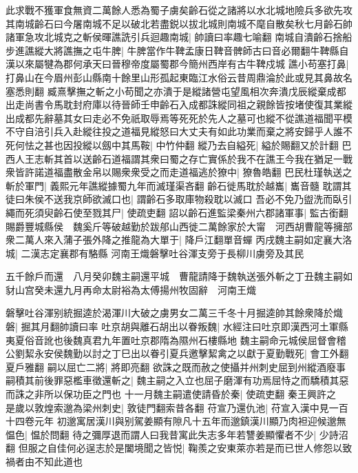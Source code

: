 此求戰不獲軍食無資二萬餘人悉為蜀子虜矣齡石從之諸將以水北城地險兵多欲先攻其南城齡石曰今屠南城不足以破北若盡鋭以拔北城則南城不麾自散矣秋七月齡石帥諸軍急攻北城克之斬侯暉譙詵引兵迴趣南城|{
	帥讀曰率趣七喻翻}
南城自潰齡石捨船步進譙縱大將譙撫之屯牛脾|{
	牛脾當作牛鞞孟康日鞞音髀師古曰音必爾翻牛鞞縣自漢以來屬犍為郡何承天曰晉穆帝度屬蜀郡今簡州西岸有古牛鞞戍城}
譙小苟塞打鼻|{
	打鼻山在今眉州彭山縣南十餘里山形孤起東臨江水俗云昔周鼎淪於此或見其鼻故名塞悉則翻}
臧熹擊撫之斬之小苟聞之亦潰于是縱諸營屯望風相次奔潰戊辰縱棄成都出走尚書令馬耽封府庫以待晉師壬申齡石入成都誅縱同祖之親餘皆按堵使復其業縱出成都先辭墓其女曰走必不免祇取辱焉等死死於先人之墓可也縱不從譙道福聞平模不守自涪引兵入赴縱往投之道福見縱怒曰大丈夫有如此功業而棄之將安歸乎人誰不死何怯之甚也因投縱以劔中其馬鞍|{
	中竹仲翻}
縱乃去自縊死|{
	縊於賜翻又於計翻}
巴西人王志斬其首以送齡石道福謂其衆曰蜀之存亡實係於我不在譙王今我在猶足一戰衆皆許諾道福盡散金帛以賜衆衆受之而走道福逃於獠中|{
	獠魯皓翻}
巴民杜瑾執送之斬於軍門|{
	義熙元年譙縱據蜀九年而滅瑾渠吝翻}
齡石徙馬耽於越巂|{
	巂音髓}
耽謂其徒曰朱侯不送我京師欲滅口也|{
	謂齡石多取庫物殺耽以滅口}
吾必不免乃盥洗而臥引繩而死須臾齡石使至戮其尸|{
	使疏吏翻}
詔以齡石進監梁秦州六郡諸軍事|{
	監古銜翻}
賜爵豐城縣侯　魏奚斤等破越勤於跋郍山西徙二萬餘家於大甯　河西胡曹龍等擁部衆二萬人來入蒲子張外降之推龍為大單于|{
	降戶江翻單音蟬}
丙戌魏主嗣如定襄大洛城|{
	二漢志定襄郡有駱縣}
河南王熾磐擊吐谷渾支旁于長柳川虜旁及其民

五千餘戶而還　八月癸卯魏主嗣還平城　曹龍請降于魏執送張外斬之丁丑魏主嗣如豺山宫癸未還九月再命太尉裕為太傅揚州牧固辭　河南王熾

磐擊吐谷渾别統掘逵於渴渾川大破之虜男女二萬三千冬十月掘逵帥其餘衆降於熾磐|{
	掘其月翻帥讀曰率}
吐京胡與離石胡出以眷叛魏|{
	水經注曰吐京即漢西河土軍縣夷夏俗音訛也後魏真君九年置吐京郡隋為隰州石樓縣地}
魏主嗣命元城侯屈督會稽公劉絜永安侯魏勤以討之丁巳出以眷引夏兵邀擊絜禽之以獻于夏勤戰死|{
	會工外翻夏戶雅翻}
嗣以屈亡二將|{
	將即亮翻}
欲誅之既而赦之使攝并州刺史屈到州縱酒廢事嗣積其前後罪惡檻車徵還斬之|{
	魏主嗣之入立也屈子磨渾有功焉屈恃之而驕積其惡而誅之非所以保功臣之門也}
十一月魏主嗣遣使請昏於秦|{
	使疏吏翻}
秦王興許之　是歲以敦煌索邈為梁州刺史|{
	敦徒門翻索昔各翻}
苻宣乃還仇池|{
	苻宣入漢中見一百十四卷元年}
初邈寓居漢川與别駕姜顯有隙凡十五年而邈鎮漢川顯乃肉袒迎候邈無愠色|{
	愠於問翻}
待之彌厚退而謂人曰我昔寓此失志多年若讐姜顯懼者不少|{
	少詩沼翻}
但服之自佳何必逞志於是闔境聞之皆悦|{
	鞠羨之安東萊亦若是而已世人修怨以致禍者由不知此道也}


